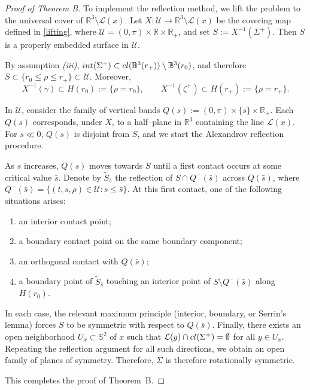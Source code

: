 \documentclass[11pt]{article}
\numberwithin{equation} {section}
\begin{document}
\begin{proof}[Proof of Theorem B]
To implement the reflection method, we lift the problem to the universal cover of
$\mathbb{R}^3\setminus \mathcal L(x)$.
Let $X:\mathcal U\to\mathbb{R}^3\setminus \mathcal L(x)$ be the covering map defined in \eqref{lifting},
where $\mathcal U=(0,\pi)\times\mathbb{R}\times\mathbb{R}_+$, and set $S:=X^{-1}(\Sigma^+)$.
Then $S$ is a properly embedded surface in $\mathcal U$.

By assumption {\it (iii)}, ${\rm int}(\Sigma^+)\subset \textup{cl}(\mathbb{B}^3 (r_+))\setminus\mathbb{B}^3(r_0)$,
and therefore $S\subset\{r_0\le\rho\le r_+\}\subset\mathcal U$.
Moreover,
\[
X^{-1}(\gamma)\subset H(r_0):=\{\rho=r_0\},
\qquad
X^{-1}(\zeta^+)\subset H(r_+):=\{\rho=r_+\}.
\]

In $\mathcal U$, consider the family of vertical bands $Q(s):=(0,\pi)\times\{s\}\times\mathbb{R}_+$.
Each $Q(s)$ corresponds, under $X$, to a half--plane in $\mathbb{R}^3$ containing the line $\mathcal L(x)$.
For $s\ll0$, $Q(s)$ is disjoint from $S$, and we start the Alexandrov reflection procedure.

As $s$ increases, $Q(s)$ moves towards $S$ until a first contact occurs at some critical value $\bar s$.
Denote by $\tilde S_{\bar s}$ the reflection of $S\cap Q^-(\bar s)$ across $Q(\bar s)$, where
$Q^-(\bar s)=\{(t,s,\rho)\in\mathcal U:s\le\bar s\}$.
At this first contact, one of the following situations arises:
\begin{enumerate}
\item[(a)] an interior contact point;
\item[(b)] a boundary contact point on the same boundary component;
\item[(c)] an orthogonal contact with $Q(\bar s)$;
\item[(d)] a boundary point of $\tilde S_{\bar s}$ touching an interior point
of $S\setminus Q^-(\bar s)$ along $H(r_0)$.
\end{enumerate}
In each case, the relevant maximum principle (interior, boundary, or Serrin's lemma) forces
$S$ to be symmetric with respect to $Q(\bar s)$. Finally, there exists an open neighborhood $U_x\subset\mathbb{S}^2$ of $x$ such that
$\mathcal L(y)\cap \textup{cl}(\Sigma^+)=\emptyset$ for all $y\in U_x$.
Repeating the reflection argument for all such directions, we obtain an open family of planes of symmetry. Therefore, $\Sigma$ is therefore rotationally symmetric.

This completes the proof of Theorem~B.
\end{proof}
\end{document}
